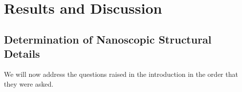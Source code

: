 \documentclass{article}
\begin{document}
  \section*{Results and Discussion}
  
  \subsection*{Determination of Nanoscopic Structural Details}
  
  
  We will now address the questions raised in the introduction in the order
  that they were asked.  %

\end{document}
